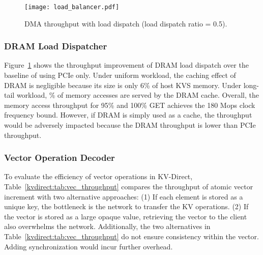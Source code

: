 \begin{figure}[t]
\centering
{\texttt{[image: load\_balancer.pdf]}}
\caption{DMA throughput with load dispatch (load dispatch ratio = 0.5).}
\label{kvdirect:fig:cache-tput}

\end{figure}

\subsubsection{DRAM Load Dispatcher}
\label{kvdirect:sec:dram-eval}

Figure~\ref{kvdirect:fig:cache-tput} shows the throughput improvement of DRAM load dispatch over the baseline of using PCIe only.
Under uniform workload, the caching effect of DRAM is negligible because its size is only 6\% of host KVS memory.
Under long-tail workload, \% of memory accesses are served by the DRAM cache. Overall, the memory access throughput for 95\% and 100\% GET achieves the 180 Mops clock frequency bound.
However, if DRAM is simply used as a cache, the throughput would be adversely impacted because the DRAM throughput is lower than PCIe throughput.

\subsubsection{Vector Operation Decoder}
\label{kvdirect:network-eval}

\begin{table}[]
\centering
{}
\caption{Throughput (GB/s) of vector operations with vector update or alternatives.}
\label{kvdirect:tab:vec_throughput}

\end{table}

To evaluate the efficiency of vector operations in KV-Direct,
Table~\ref{kvdirect:tab:vec_throughput} compares the throughput of atomic vector increment with two alternative approaches:
(1) If each element is stored as a unique key, the bottleneck is the network to transfer the KV operations.
(2) If the vector is stored as a large opaque value, retrieving the vector to the client also overwhelms the network.
Additionally, the two alternatives in Table~\ref{kvdirect:tab:vec_throughput} do not ensure consistency within the vector. Adding synchronization would incur further overhead.


